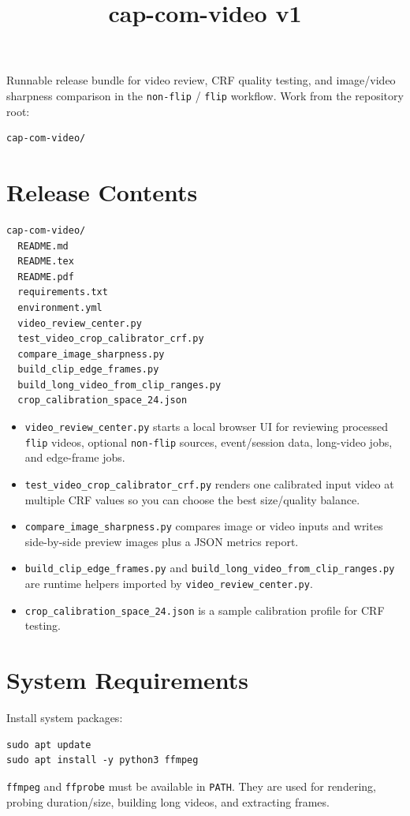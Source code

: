 \documentclass[11pt,a4paper]{article}
\begin{document}
\title{cap-com-video v1}
\date{}
\maketitle
Runnable release bundle for video review, CRF quality testing, and image/video sharpness comparison in the \texttt{non-flip} / \texttt{flip} workflow.
Work from the repository root:
\begin{verbatim}
cap-com-video/
\end{verbatim}
\section{Release Contents}
\begin{verbatim}
cap-com-video/
  README.md
  README.tex
  README.pdf
  requirements.txt
  environment.yml
  video_review_center.py
  test_video_crop_calibrator_crf.py
  compare_image_sharpness.py
  build_clip_edge_frames.py
  build_long_video_from_clip_ranges.py
  crop_calibration_space_24.json
\end{verbatim}
\begin{itemize}
\item \texttt{video\_review\_center.py} starts a local browser UI for reviewing processed \texttt{flip} videos, optional \texttt{non-flip} sources, event/session data, long-video jobs, and edge-frame jobs.
\item \texttt{test\_video\_crop\_calibrator\_crf.py} renders one calibrated input video at multiple CRF values so you can choose the best size/quality balance.
\item \texttt{compare\_image\_sharpness.py} compares image or video inputs and writes side-by-side preview images plus a JSON metrics report.
\item \texttt{build\_clip\_edge\_frames.py} and \texttt{build\_long\_video\_from\_clip\_ranges.py} are runtime helpers imported by \texttt{video\_review\_center.py}.
\item \texttt{crop\_calibration\_space\_24.json} is a sample calibration profile for CRF testing.
\end{itemize}
\section{System Requirements}
Install system packages:
\begin{verbatim}
sudo apt update
sudo apt install -y python3 ffmpeg
\end{verbatim}
\texttt{ffmpeg} and \texttt{ffprobe} must be available in \texttt{PATH}. They are used for rendering, probing duration/size, building long videos, and extracting frames.
\end{document}
